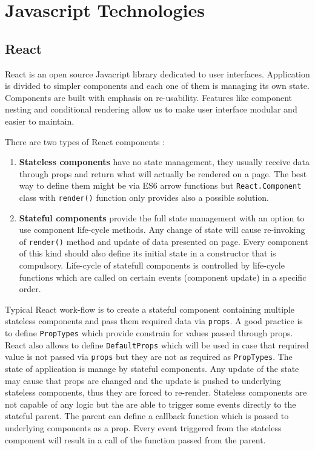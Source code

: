 \chapter{Javascript Technologies}

\section{React}
React is an open source Javacript library dedicated to user interfaces. Application is divided to simpler components and each one of them is managing its own state. Components are built with emphasis on re-usability. Features like component nesting and conditional rendering \cite{conditional} allow us to make user interface modular and easier to maintain.

There are two types of React components \cite{React}:
\begin{enumerate}
\item \textbf{Stateless components} have no state management, they usually receive data through props and return what will actually be rendered on a page. The best way to define them might be via ES6 arrow functions \cite{arrowFunctions} but \texttt{React.Component} class with \texttt{render()} function only provides also a possible solution.

\item \textbf{Stateful components} provide the full state management with an option to use component life-cycle methods. Any change of state will cause re-invoking of \texttt{render()} method and update of data presented on page. Every component of this kind should also define its initial state in a constructor that is compulsory.
Life-cycle of statefull components is controlled by life-cycle functions which are called on certain events (component update) in a specific order.
\end{enumerate}

Typical React work-flow is to create a stateful component containing multiple stateless components and pass them required data via \texttt{props}. A good practice is to define \texttt{PropTypes} which provide constrain for values passed through props. React also allows to define \texttt{DefaultProps} which will be used in case that required value is not passed via \texttt{props} but they are not as required as \texttt{PropTypes}. The state of application is manage by stateful components. Any update of the state may cause that props are changed and the update is pushed to underlying stateless components, thus they are forced to re-render. Stateless components are not capable of any logic but the are able to trigger some events directly to the stateful parent. The parent can define a callback function which is passed to underlying components as a prop. Every event triggered from the stateless component will result in a call of the function passed from the parent. 

